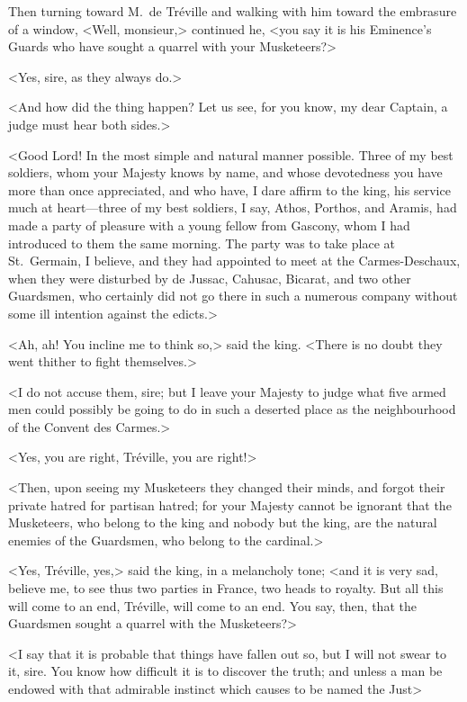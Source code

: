 Then turning toward M.~de Tréville and walking with him toward the embrasure of a window, <Well, monsieur,> continued he, <you say it is his Eminence's Guards who have sought a quarrel with your Musketeers?> 

<Yes, sire, as they always do.> 

<And how did the thing happen? Let us see, for you know, my dear Captain, a judge must hear both sides.> 

<Good Lord! In the most simple and natural manner possible. Three of my best soldiers, whom your Majesty knows by name, and whose devotedness you have more than once appreciated, and who have, I dare affirm to the king, his service much at heart—three of my best soldiers, I say, Athos, Porthos, and Aramis, had made a party of pleasure with a young fellow from Gascony, whom I had introduced to them the same morning. The party was to take place at St.~Germain, I believe, and they had appointed to meet at the Carmes-Deschaux, when they were disturbed by de Jussac, Cahusac, Bicarat, and two other Guardsmen, who certainly did not go there in such a numerous company without some ill intention against the edicts.> 

<Ah, ah! You incline me to think so,> said the king. <There is no doubt they went thither to fight themselves.> 

<I do not accuse them, sire; but I leave your Majesty to judge what five armed men could possibly be going to do in such a deserted place as the neighbourhood of the Convent des Carmes.> 

<Yes, you are right, Tréville, you are right!> 

<Then, upon seeing my Musketeers they changed their minds, and forgot their private hatred for partisan hatred; for your Majesty cannot be ignorant that the Musketeers, who belong to the king and nobody but the king, are the natural enemies of the Guardsmen, who belong to the cardinal.> 

<Yes, Tréville, yes,> said the king, in a melancholy tone; <and it is very sad, believe me, to see thus two parties in France, two heads to royalty. But all this will come to an end, Tréville, will come to an end. You say, then, that the Guardsmen sought a quarrel with the Musketeers?> 

<I say that it is probable that things have fallen out so, but I will not swear to it, sire. You know how difficult it is to discover the truth; and unless a man be endowed with that admirable instinct which causes  to be named the Just\longdash> 

